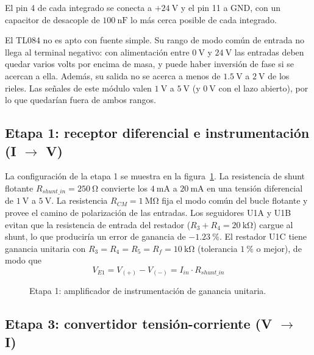 El pin 4 de cada integrado se conecta a $+\SI{24}{\volt}$ y el pin 11 a GND, con un capacitor de desacople de
$\SI{100}{\nano\farad}$ lo más cerca posible de cada integrado.

El TL084 no es apto con fuente simple. Su rango de modo común de entrada no llega al terminal negativo: con
alimentación entre $\SI{0}{\volt}$ y $\SI{24}{\volt}$ las entradas deben quedar varios volts por encima de masa,
y puede haber inversión de fase si se acercan a ella. Además, su salida no se acerca a menos de
$\SI{1.5}{\volt}$ a $\SI{2}{\volt}$ de los rieles. Las señales de este módulo valen $\SI{1}{\volt}$ a
$\SI{5}{\volt}$ (y $\SI{0}{\volt}$ con el lazo abierto), por lo que quedarían fuera de ambos rangos.

\subsection{Etapa 1: receptor diferencial e instrumentación (I \texorpdfstring{$\rightarrow$}{->} V)}
\label{subsec:campo-etapa1}

La configuración de la etapa 1 se muestra en la figura~\ref{crkt:etapa1}. La resistencia de shunt flotante
$R_{shunt\_in} = \SI{250}{\ohm}$ convierte los $\SI{4}{\milli\ampere}$ a $\SI{20}{\milli\ampere}$ en una tensión
diferencial de $\SI{1}{\volt}$ a $\SI{5}{\volt}$. La resistencia $R_{CM} = \SI{1}{\mega\ohm}$ fija el modo común del
bucle flotante y provee el camino de polarización de las entradas. Los seguidores U1A y U1B evitan que la resistencia
de entrada del restador ($R_3 + R_4 = \SI{20}{\kilo\ohm}$) cargue al shunt, lo que produciría un error de ganancia de
$\SI{-1.23}{\percent}$. El restador U1C tiene ganancia unitaria con $R_3 = R_4 = R_5 = R_f = \SI{10}{\kilo\ohm}$
(tolerancia $\SI{1}{\percent}$ o mejor), de modo que
\begin{equation}
  V_{E1} = V_{(+)} - V_{(-)} = I_{in} \cdot R_{shunt\_in}
  \label{eq:ve1}
\end{equation}

\begin{figure}[H]
  \centering
  
  \caption{Etapa 1: amplificador de instrumentación de ganancia unitaria.}
  \label{crkt:etapa1}
\end{figure}

\subsection{Etapa 3: convertidor tensión-corriente (V \texorpdfstring{$\rightarrow$}{->} I)}
\label{subsec:campo-etapa3}

